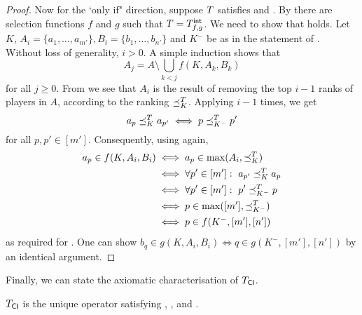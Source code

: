 \begin{proof}
    Now for the `only if" direction, suppose $T$ satisfies
    \chaindef{} and \rankremoval{}. By
     there are selection functions
    $f$ and $g$ such that $T = {T_{f, g}^\mathsf{int}}$. We need to show that
    \smi{} holds. Let $K$, $A_i = \{a_1, \ldots, a_{m'}\}, B_i = \{b_1,
    \ldots, b_{n'}\}$ and $K^-$ be as in the statement of \smi{}.
    Without loss of generality, $i > 0 $. A simple induction shows that
    \[
        A_j = A \setminus \bigcup_{k < j}{f(K, A_k, B_k)}
    \]
    for all $j \ge 0$. From  we see
    that $A_i$ is the result of removing the top $i - 1$ ranks of players in
    $A$, according to the ranking $\preceq_K^T$. Applying
    \rankremoval{} $i - 1$ times, we get
    \[
        a_p \preceq_K^T a_{p'}
        \iff p \preceq_{K^-}^T p'
    \]
    for all $p, p' \in [m']$. Consequently, using
     again,
    \begin{align*}
        a_p \in f(K, A_i, B_i)
        &\iff a_p \in \max(A_i, {\preceq_K^T}) \\
        &\iff \forall p' \in [m']:\ a_{p'} \preceq_K^T a_p \\
        &\iff \forall p' \in [m']:\ p' \preceq_{K^-}^T p \\
        &\iff p \in \max([m'], {\preceq_{K^-}^T}) \\
        &\iff p \in f(K^-, [m'], [n'])
    \end{align*}
    as required for \smi{}. One can show $b_q \in g(K, A_i, B_i) \iff q
    \in g(K^-, [m'], [n'])$ by an identical argument.
\end{proof}

Finally, we can state the axiomatic characterisation of ${T_{\mathsf{CI}}}$.

\begin{theorem}
    ${T_{\mathsf{CI}}}$ is the unique operator satisfying \dualaxiom{},
    \chaindef{}, \rankremoval{} and \argmaxaxiom{}.
\end{theorem}

